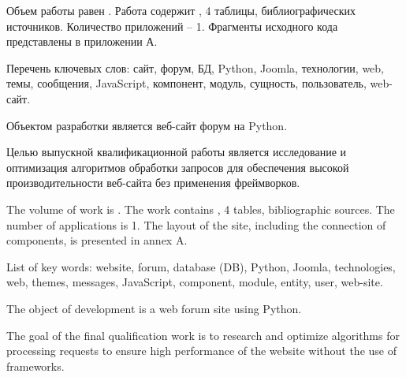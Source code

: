 
Объем работы равен . Работа содержит , 4 таблицы,  библиографических источников. Количество приложений – 1. Фрагменты исходного кода представлены в приложении А.

Перечень ключевых слов: сайт, форум, БД, Python, Joomla, технологии, web, темы, сообщения, JavaScript, компонент, модуль, сущность, пользователь, web-сайт.

Объектом разработки является веб-сайт форум на Python.

Целью выпускной квалификационной работы является исследование и оптимизация алгоритмов обработки запросов для обеспечения высокой производительности веб-сайта без применения фреймворков.



  
The volume of work is . The work contains , 4 tables,  bibliographic sources. The number of applications is 1. The layout of the site, including the connection of components, is presented in annex A.

List of key words: website, forum, database (DB), Python, Joomla, technologies, web, themes, messages, JavaScript, component, module, entity, user, web-site.

The object of development is a web forum site using Python.

The goal of the final qualification work is to research and optimize algorithms for processing requests to ensure high performance of the website without the use of frameworks.


